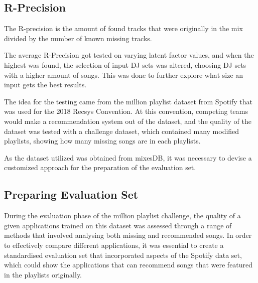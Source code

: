\subsection{R-Precision}
The R-precision is the amount of found tracks that were originally in the mix divided by the number of known missing tracks.



The average R-Precision got tested on varying latent factor values, and when the highest was found, the selection of input DJ sets was altered, choosing DJ sets with a higher amount of songs. This was done to further explore what size an input gets the best results.

The idea for the testing came from the million playlist dataset from Spotify \citep{aicrowd_aicrowd_2023} that was used for the 2018 Recsys Convention. At this convention, competing teams would make a recommendation system out of the dataset, and the quality of the dataset was tested with a challenge dataset, which contained many modified playlists, showing how many missing songs are in each playlists.

As the dataset utilized was obtained from mixesDB, it was necessary to devise a customized approach for the preparation of the evaluation set.

\subsection{Preparing Evaluation Set}
During the evaluation phase of the million playlist challenge, the quality of a given applications trained on this dataset was assessed through a range of methods that involved analysing both missing and recommended songs. In order to effectively compare different applications, it was essential to create a standardised evaluation set that incorporated aspects of the Spotify data set, which could show the applications that can recommend songs that were featured in the playlists originally.

